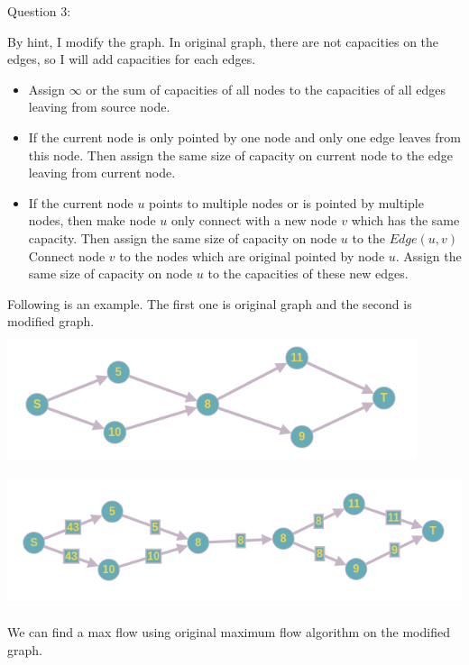 \documentclass[12pt]{article}
\begin{document}
\pagebreak
\noindent
\large Question 3: \vspace{5mm} \par
\normalsize 
By hint, I modify the graph. 
In original graph, there are not capacities on the edges, so I will add capacities for each edges.

\begin{itemize}
  \item Assign $\infty$ or the sum of capacities of all nodes to the capacities of all edges leaving from source node. 
  \item If the current node is only pointed by one node and only one edge leaves from this node.
	Then assign the same size of capacity on current node to the edge leaving from current node. 
  \item If the current node $u$ points to multiple nodes or is pointed by multiple nodes, 
	then make node $u$ only connect with a new node $v$ which has the same capacity.
	Then assign the same size of capacity on node $u$ to the $Edge(u, v)$ 
	Connect node $v$ to the nodes which are original pointed by node $u$. 
	Assign the same size of capacity on node $u$ to the capacities of these new edges.  	

\end{itemize}
\par
Following is an example. The first one is original graph and the second is modified graph. \\
\includegraphics[width=12cm, height=4cm]{question3L} \\
\includegraphics[width=15cm, height=4cm]{question3R} 

\par
We can find a max flow using original maximum flow algorithm on the modified graph.
\\
\end{document}
